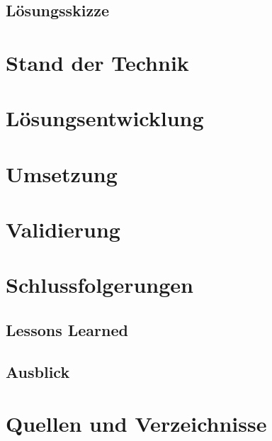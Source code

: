 \documentclass[11pt]{article} %
\begin{document}
\subsection{Lösungsskizze}

\section{Stand der Technik}

\section{Lösungsentwicklung}

\section{Umsetzung}

\section{Validierung}

\section{Schlussfolgerungen}
\subsection{Lessons Learned}
\subsection{Ausblick}


\newpage
\section{Quellen und Verzeichnisse}


\newpage
\listoffigures
{}
\newpage
\listoftables
{}

\newpage
\appendix
\setcounter{figure}{0}
\setcounter{secnumdepth}{0}
\end{document}
